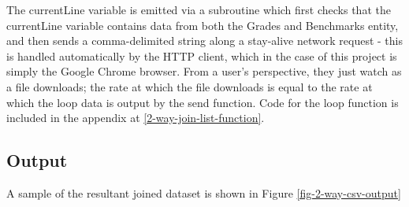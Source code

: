 The currentLine variable is emitted via a subroutine which first checks that the currentLine variable contains data from both the Grades and Benchmarks entity, and then sends a comma-delimited string along a stay-alive network request - this is handled automatically by the HTTP client, which in the case of this project is simply the Google Chrome browser. From a user's perspective, they just watch as a file downloads; the rate at which the file downloads is equal to the rate at which the loop data is output by the send function. Code for the loop function is included in the appendix at \ref{2-way-join-list-function}.



\subsection{Output}
A sample of the resultant joined dataset is shown in Figure \ref{fig-2-way-csv-output}
